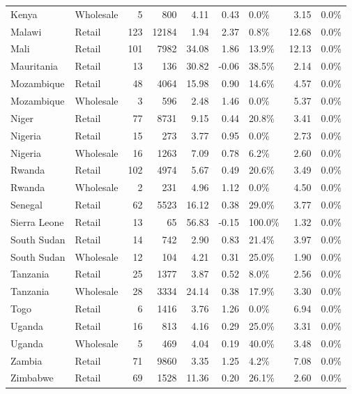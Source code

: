 \begin{table}[ht]
\begin{tabular}{llrrrrlrl}
  Kenya & Wholesale &   5 & 800 & 4.11 & 0.43 & 0.0\% & 3.15 & 0.0\% \\ 
  Malawi & Retail & 123 & 12184 & 1.94 & 2.37 & 0.8\% & 12.68 & 0.0\% \\ 
  Mali & Retail & 101 & 7982 & 34.08 & 1.86 & 13.9\% & 12.13 & 0.0\% \\ 
  Mauritania & Retail &  13 & 136 & 30.82 & -0.06 & 38.5\% & 2.14 & 0.0\% \\ 
  Mozambique & Retail &  48 & 4064 & 15.98 & 0.90 & 14.6\% & 4.57 & 0.0\% \\ 
  Mozambique & Wholesale &   3 & 596 & 2.48 & 1.46 & 0.0\% & 5.37 & 0.0\% \\ 
  Niger & Retail &  77 & 8731 & 9.15 & 0.44 & 20.8\% & 3.41 & 0.0\% \\ 
  Nigeria & Retail &  15 & 273 & 3.77 & 0.95 & 0.0\% & 2.73 & 0.0\% \\ 
  Nigeria & Wholesale &  16 & 1263 & 7.09 & 0.78 & 6.2\% & 2.60 & 0.0\% \\ 
  Rwanda & Retail & 102 & 4974 & 5.67 & 0.49 & 20.6\% & 3.49 & 0.0\% \\ 
  Rwanda & Wholesale &   2 & 231 & 4.96 & 1.12 & 0.0\% & 4.50 & 0.0\% \\ 
  Senegal & Retail &  62 & 5523 & 16.12 & 0.38 & 29.0\% & 3.77 & 0.0\% \\ 
  Sierra Leone & Retail &  13 &  65 & 56.83 & -0.15 & 100.0\% & 1.32 & 0.0\% \\ 
  South Sudan & Retail &  14 & 742 & 2.90 & 0.83 & 21.4\% & 3.97 & 0.0\% \\ 
  South Sudan & Wholesale &  12 & 104 & 4.21 & 0.31 & 25.0\% & 1.90 & 0.0\% \\ 
  Tanzania & Retail &  25 & 1377 & 3.87 & 0.52 & 8.0\% & 2.56 & 0.0\% \\ 
  Tanzania & Wholesale &  28 & 3334 & 24.14 & 0.38 & 17.9\% & 3.30 & 0.0\% \\ 
  Togo & Retail &   6 & 1416 & 3.76 & 1.26 & 0.0\% & 6.94 & 0.0\% \\ 
  Uganda & Retail &  16 & 813 & 4.16 & 0.29 & 25.0\% & 3.31 & 0.0\% \\ 
  Uganda & Wholesale &   5 & 469 & 4.04 & 0.19 & 40.0\% & 3.48 & 0.0\% \\ 
  Zambia & Retail &  71 & 9860 & 3.35 & 1.25 & 4.2\% & 7.08 & 0.0\% \\ 
  Zimbabwe & Retail &  69 & 1528 & 11.36 & 0.20 & 26.1\% & 2.60 & 0.0\% \\ 
   \hline
\end{tabular}
\end{table}
